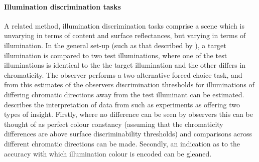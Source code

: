 \paragraph{Illumination discrimination tasks}
A related method, illumination discrimination tasks comprise a scene which is unvarying in terms of content and surface reflectances, but varying in terms of illumination. In the general set-up (such as that described by \citet{pearce_chromatic_2014}), a target illumination is compared to two test illuminations, where one of the test illuminations is identical to the the target illumination and the other differs in chromaticity. The observer performs a two-alternative forced choice task, and from this estimates of the observers discrimination thresholds for illuminations of differing chromatic directions away from the test illuminant can be estimated. \citet{aston_illumination_2019} describes the interpretation of data from such as experiments as offering two types of insight. Firstly, where no difference can be seen by observers this can be thought of as perfect colour constancy (assuming that the chromaticity differences are above surface discriminability thresholds) and comparisons across different chromatic directions can be made. Secondly, an indication as to the accuracy with which illumination colour is encoded can be gleaned.












